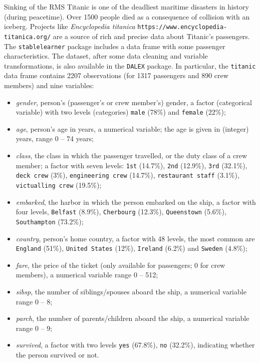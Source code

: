 \documentclass[]{krantz}
\providecommand{\tightlist}{%
  \setlength{\itemsep}{0pt}\setlength{\parskip}{0pt}}
\begin{document}
Sinking of the RMS Titanic is one of the deadliest maritime disasters in history (during peacetime). Over 1500 people died as a consequence of collision with an iceberg. Projects like \emph{Encyclopedia titanica} \texttt{https://www.encyclopedia-titanica.org/} are a source of rich and precise data about Titanic's passengers.
The \texttt{stablelearner} package includes a data frame with some passenger characteristics.
The dataset, after some data cleaning and variable transformations, is also available in the \texttt{DALEX} package. In particular, the \texttt{titanic} data frame contains 2207 observations (for 1317 passengers and 890 crew members) and nine variables:

\begin{itemize}
\tightlist
\item
  \emph{gender}, person's (passenger's or crew member's) gender, a factor (categorical variable) with two levels (categories) \texttt{male} (78\%) and \texttt{female} (22\%);
\item
  \emph{age}, person's age in years, a numerical variable; the age is given in (integer) years, range 0 -- 74 years;
\item
  \emph{class}, the class in which the passenger travelled, or the duty class of a crew member; a factor with seven levels: \texttt{1st} (14.7\%), \texttt{2nd} (12.9\%), \texttt{3rd} (32.1\%), \texttt{deck\ crew} (3\%), \texttt{engineering\ crew} (14.7\%), \texttt{restaurant\ staff} (3.1\%), \texttt{victualling\ crew} (19.5\%);
\item
  \emph{embarked}, the harbor in which the person embarked on the ship, a factor with four levels, \texttt{Belfast} (8.9\%), \texttt{Cherbourg} (12.3\%), \texttt{Queenstown} (5.6\%), \texttt{Southampton} (73.2\%);
\item
  \emph{country}, person's home country, a factor with 48 levels, the most common are \texttt{England} (51\%), \texttt{United\ States} (12\%), \texttt{Ireland} (6.2\%) and \texttt{Sweden} (4.8\%);
\item
  \emph{fare}, the price of the ticket (only available for passengers; 0 for crew members), a numerical variable range 0 -- 512;
\item
  \emph{sibsp}, the number of siblings/spouses aboard the ship, a numerical variable range 0 -- 8;
\item
  \emph{parch}, the number of parents/children aboard the ship, a numerical variable range 0 -- 9;
\item
  \emph{survived}, a factor with two levels \texttt{yes} (67.8\%), \texttt{no} (32.2\%), indicating whether the person survived or not.
\end{itemize}
\end{document}
